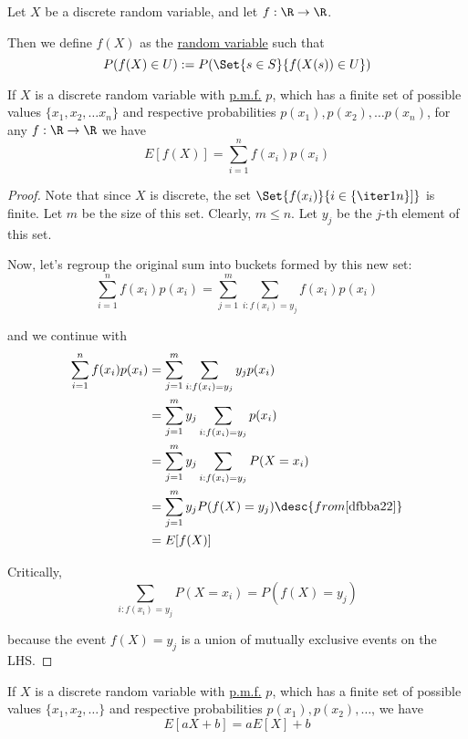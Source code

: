 Let $X$ be a discrete random variable, and let $f:\R\to\R$.

Then we define $f(X)$ as the \href{b96960b}{random variable} such that
$$
  P(f(X)\in U):=P(\Set{s\in S}{f(X(s))\in U})
$$

\label{e9b530c}

If $X$ is a discrete random variable with \href{bcef5f1}{p.m.f.} $p$, which has
a finite set of possible values $\{x_1,x_2,\ldots x_n\}$ and respective
probabilities $p(x_1),p(x_2),\ldots p(x_n)$, for any $f:\R\to\R$ we have
$$
  E[f(X)]=\sum_{i=1}^nf(x_i)p(x_i)
$$

\begin{proof}
  Note that since $X$ is discrete, the set $\Set{f(x_i)}{i\in\{\iter1n\}]}$ is
  finite. Let $m$ be the size of this set. Clearly, $m\leq n$. Let $y_j$ be the
  $j$-th element of this set.

  Now, let's regroup the original sum into buckets formed by this new set:
  \begin{equation*}
    \sum_{i=1}^nf(x_i)p(x_i)
    =\sum_{j=1}^m\sum_{i:f(x_i)=y_j}f(x_i)p(x_i)
  \end{equation*}

  and we continue with
  \begin{align*}
    \sum_{i=1}^nf(x_i)p(x_i)
     &=\sum_{j=1}^m\sum_{i:f(x_i)=y_j}y_jp(x_i)                \\
     &=\sum_{j=1}^my_j\sum_{i:f(x_i)=y_j}p(x_i)                \\
     &=\sum_{j=1}^my_j\sum_{i:f(x_i)=y_j}P(X=x_i)              \\
     &=\sum_{j=1}^my_jP(f(X)=y_j)\desc{from \autoref{dfbba22}} \\
     &=E[f(X)]
  \end{align*}

  Critically,
  $$
    \sum_{i:f(x_i)=y_j}P(X=x_i)=P(f(X)=y_j)
  $$

  because the event $f(X)=y_j$ is a union of mutually exclusive events on the
  LHS.
\end{proof}

\label{ec9df73}

If $X$ is a discrete random variable with \href{bcef5f1}{p.m.f.} $p$, which has
a finite set of possible values $\{x_1,x_2,\ldots\}$ and respective
probabilities $p(x_1),p(x_2),\ldots$, we have
$$
  E[aX+b]=aE[X]+b
$$

